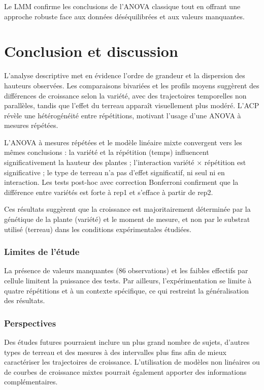 \documentclass[12pt, a4paper]{report}
\begin{document}
Le LMM confirme les conclusions de l'ANOVA classique tout en offrant une approche robuste
face aux données déséquilibrées et aux valeurs manquantes.

\chapter*{Conclusion et discussion}

L'analyse descriptive met en évidence l'ordre de grandeur et la dispersion des hauteurs
observées. Les comparaisons bivariées et les profils moyens suggèrent des différences de
croissance selon la variété, avec des trajectoires temporelles non parallèles, tandis que
l'effet du terreau apparaît visuellement plus modéré. L'ACP révèle une hétérogénéité entre
répétitions, motivant l'usage d'une ANOVA à mesures répétées.

L'ANOVA à mesures répétées et le modèle linéaire mixte convergent vers les mêmes
conclusions : la variété et la répétition (temps) influencent significativement la hauteur
des plantes ; l'interaction variété $\times$ répétition est significative ; le type de
terreau n'a pas d'effet significatif, ni seul ni en interaction. Les tests post-hoc avec
correction Bonferroni confirment que la différence entre variétés est forte à rep1 et
s'efface à partir de rep2.

Ces résultats suggèrent que la croissance est majoritairement déterminée par la génétique de
la plante (variété) et le moment de mesure, et non par le substrat utilisé (terreau) dans
les conditions expérimentales étudiées.

\subsection*{Limites de l'étude}
La présence de valeurs manquantes (86 observations) et les faibles effectifs par cellule
limitent la puissance des tests. Par ailleurs, l'expérimentation se limite à quatre
répétitions et à un contexte spécifique, ce qui restreint la généralisation des résultats.

\subsection*{Perspectives}
Des études futures pourraient inclure un plus grand nombre de sujets, d'autres types de
terreau et des mesures à des intervalles plus fins afin de mieux caractériser les trajectoires
de croissance. L'utilisation de modèles non linéaires ou de courbes de croissance mixtes
pourrait également apporter des informations complémentaires.
\end{document}
